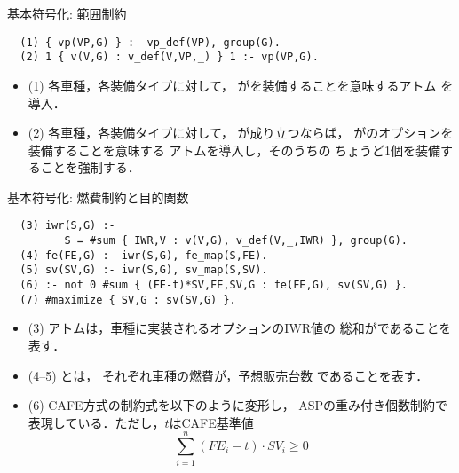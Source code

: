 \documentclass[dvipdfmx, 11pt]{beamer}
\begin{document}
\begin{frame}[fragile]{基本符号化: 範囲制約}
 \begin{center} 
 \end{center}

\vfill
\begin{exampleblock}{}
\begin{lstlisting}
  (1) { vp(VP,G) } :- vp_def(VP), group(G). 
  (2) 1 { v(V,G) : v_def(V,VP,_) } 1 :- vp(VP,G).
\end{lstlisting}
\end{exampleblock}
\vfill
\begin{itemize}
\item (1)
  各車種，各装備タイプに対して，
  がを装備することを意味するアトム
  を導入．
\item (2)
  各車種，各装備タイプに対して，
  が成り立つならば，
  がのオプションを装備することを意味する
  アトムを導入し，そのうちの
  ちょうど1個を装備することを強制する．
\end{itemize}
\end{frame}
\begin{frame}[fragile]{基本符号化: 燃費制約と目的関数}
\begin{exampleblock}{}\small
\begin{lstlisting}
  (3) iwr(S,G) :- 
         S = #sum { IWR,V : v(V,G), v_def(V,_,IWR) }, group(G).
  (4) fe(FE,G) :- iwr(S,G), fe_map(S,FE).
  (5) sv(SV,G) :- iwr(S,G), sv_map(S,SV).
  (6) :- not 0 #sum { (FE-t)*SV,FE,SV,G : fe(FE,G), sv(SV,G) }.
  (7) #maximize { SV,G : sv(SV,G) }.
\end{lstlisting}
\end{exampleblock}
\vfill
\begin{itemize}
\item (3)
  アトムは，車種に実装されるオプションのIWR値の
  総和がであることを表す．
\item (4--5)
  とは，
  それぞれ車種の燃費が，予想販売台数
  であることを表す．
\item (6)
  CAFE方式の制約式を以下のように変形し，
  ASPの重み付き個数制約で表現している．ただし，$t$はCAFE基準値
  \[\sum_{i=1}^{n} (FE_{i}-t)\cdot SV_{i} \geq 0\]
\end{itemize}
\end{frame}
\end{document}
